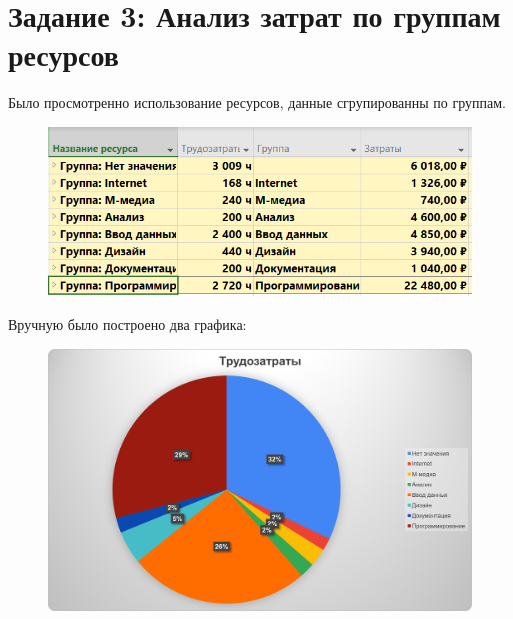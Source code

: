 \section{Задание 3: Анализ затрат по группам ресурсов}

Было просмотренно использование ресурсов, данные сгрупированны по группам.

\begin{figure}[H]
	\begin{center}
		\includegraphics[width=\textwidth]{imgs/task_2_0.png}
	\end{center}
\end{figure}

Вручную было построено два графика:

\begin{figure}[H]
	\begin{center}
		\includegraphics[width=\textwidth]{imgs/task_2_1.png}
	\end{center}
\end{figure}

